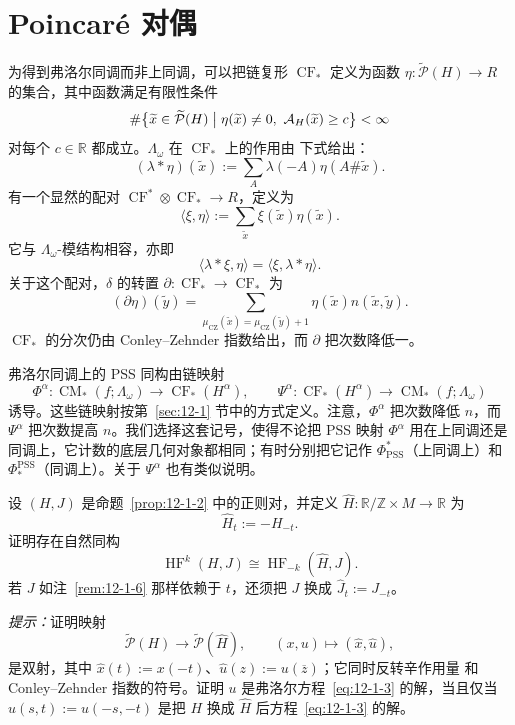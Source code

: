 
\section{Poincaré 对偶}\label{sec:12-3}

为得到弗洛尔同调而非上同调，可以把链复形 $\operatorname{CF}_*$ 定义为函数
$\eta:\widetilde{\mathcal P}(H)\to R$ 的集合，其中函数满足有限性条件
\[
  \#\bigl\{\widetilde x\in\widetilde{\mathcal P}(H)\bigm|
  \eta(\widetilde x)\ne0,\ \mathcal A_H(\widetilde x)\ge c\bigr\}<\infty
\]
对每个 $c\in\mathbb R$ 都成立。$\Lambda_\omega$ 在 $\operatorname{CF}_*$ 上的作用由
下式给出：
\[
  (\lambda*\eta)(\widetilde x)
  :=\sum_A\lambda(-A)\eta(A\#\widetilde x).
\]
有一个显然的配对 $\operatorname{CF}^*\otimes\operatorname{CF}_*\to R$，定义为
\begin{equation}\label{eq:12-3-1}
  \langle\xi,\eta\rangle
  :=\sum_{\widetilde x}\xi(\widetilde x)\eta(\widetilde x).
\end{equation}
它与 $\Lambda_\omega$-模结构相容，亦即
\[
  \langle\lambda*\xi,\eta\rangle=\langle\xi,\lambda*\eta\rangle.
\]
关于这个配对，$\delta$ 的转置
$\partial:\operatorname{CF}_*\to\operatorname{CF}_*$ 为
\[
  (\partial\eta)(\widetilde y)
  =\sum_{\mu_{\mathrm{CZ}}(\widetilde x)
  =\mu_{\mathrm{CZ}}(\widetilde y)+1}
  \eta(\widetilde x)n(\widetilde x,\widetilde y).
\]
$\operatorname{CF}_*$ 的分次仍由 Conley--Zehnder 指数给出，而 $\partial$ 把次数降低一。

弗洛尔同调上的 PSS 同构由链映射
\[
  \Phi^\alpha:\operatorname{CM}_*(f;\Lambda_\omega)
  \longrightarrow\operatorname{CF}_*(H^\alpha),
  \qquad
  \Psi^\alpha:\operatorname{CF}_*(H^\alpha)
  \longrightarrow\operatorname{CM}_*(f;\Lambda_\omega)
\]
诱导。这些链映射按第~\ref{sec:12-1} 节中的方式定义。注意，$\Phi^\alpha$ 把次数降低
$n$，而 $\Psi^\alpha$ 把次数提高 $n$。我们选择这套记号，使得不论把 PSS 映射
$\Phi^\alpha$ 用在上同调还是同调上，它计数的底层几何对象都相同；有时分别把它记作
$\Phi^*_{\mathrm{PSS}}$（上同调上）和 $\Phi^{\mathrm{PSS}}_*$（同调上）。关于
$\Psi^\alpha$ 也有类似说明。

\begin{exercise}\label{ex:12-3-1}
设 $(H,J)$ 是命题~\ref{prop:12-1-2} 中的正则对，并定义
$\widehat H:\mathbb R/\mathbb Z\times M\to\mathbb R$ 为
\[
  \widehat H_t:=-H_{-t}.
\]
证明存在自然同构
\[
  \operatorname{HF}^k(H,J)\cong\operatorname{HF}_{-k}(\widehat H,J).
\]
若 $J$ 如注~\ref{rem:12-1-6} 那样依赖于 $t$，还须把 $J$ 换成
$\widehat J_t:=J_{-t}$。

\emph{提示：}证明映射
\[
  \widetilde{\mathcal P}(H)\longrightarrow
  \widetilde{\mathcal P}(\widehat H),
  \qquad (x,u)\longmapsto(\widehat x,\widehat u),
\]
是双射，其中 $\widehat x(t):=x(-t)$、$\widehat u(z):=u(\overline z)$；它同时反转辛作用量
和 Conley--Zehnder 指数的符号。证明 $u$ 是弗洛尔方程~\eqref{eq:12-1-3} 的解，当且仅当
$\widehat u(s,t):=u(-s,-t)$ 是把 $H$ 换成 $\widehat H$ 后方程~\eqref{eq:12-1-3}
的解。
\end{exercise}

